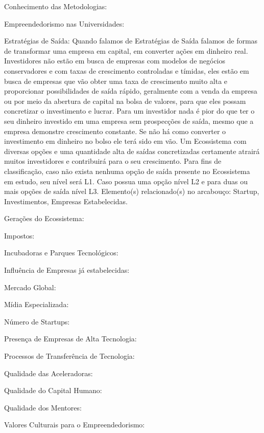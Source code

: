 \begin{description}
  \item Conhecimento das Metodologias:
  
  \item Empreendedorismo nas Universidades:
  
  \item Estratégias de Saída: Quando falamos de Estratégias de Saída falamos de formas de transformar uma empresa em capital, em converter ações em dinheiro real. Investidores não estão em busca de empresas com modelos de negócios conservadores e com taxas de crescimento controladas e tímidas, eles estão em busca de empresas que vão obter uma taxa de crescimento muito alta e proporcionar possibilidades de saída rápido, geralmente com a venda da empresa ou por meio da abertura de capital na bolsa de valores, para que eles possam concretizar o investimento e lucrar. Para um investidor nada é pior do que ter o seu dinheiro investido em uma empresa sem prospecções de saída, mesmo que a empresa demonstre crescimento constante. Se não há como converter o investimento em dinheiro no bolso ele terá sido em vão. Um Ecossistema com diversas opções e uma quantidade alta de saídas concretizadas certamente atrairá muitos investidores e contribuirá para o seu crescimento. Para fins de classificação, caso não exista nenhuma opção de saída presente no Ecossistema em estudo, seu nível será L1. Caso possua uma opção nível L2 e para duas ou mais opções de saída nível L3. Elemento(s) relacionado(s) no arcabouço: Startup, Investimentos, Empresas Estabelecidas.
  
  \item Gerações do Ecossistema:
  
  \item Impostos:
  
  \item Incubadoras e Parques Tecnológicos:
  
  \item Influência de Empresas já estabelecidas:
  
  \item Mercado Global:
  
  \item Mídia Especializada:
  
  \item Número de Startups:
  
  \item Presença de Empresas de Alta Tecnologia:
  
  \item Processos de Transferência de Tecnologia:
  
  \item Qualidade das Aceleradoras:
  
  \item Qualidade do Capital Humano:
  
  \item Qualidade dos Mentores:
  
  \item Valores Culturais para o Empreendedorismo:
\end{description}

